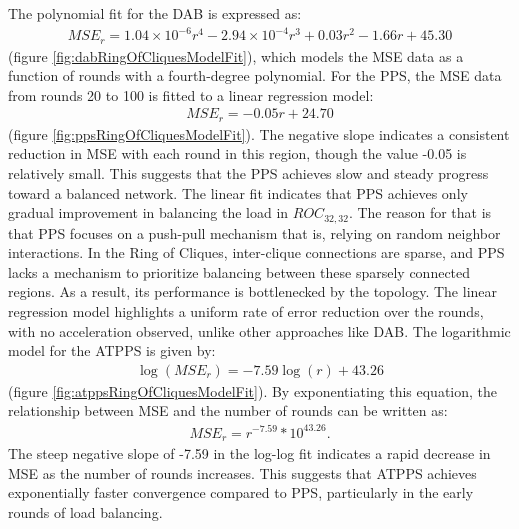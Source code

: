 The polynomial fit for the DAB is expressed as:
\begin{align}
    MSE_r=1.04\times 10^{-6}r^{4}-2.94\times 10^{-4}r^{3}+0.03r^{2}-1.66r+45.30    
\end{align}
(figure \ref{fig:dabRingOfCliquesModelFit}), which models the MSE data as a function of rounds with a fourth-degree polynomial. For the PPS, the MSE data from rounds 20 to 100 is fitted to a linear regression model:
\begin{align}
    MSE_r=-0.05r+24.70
\end{align}
(figure \ref{fig:ppsRingOfCliquesModelFit}). The negative slope indicates a consistent reduction in MSE with each round in this region, though the value -0.05 is relatively small. This suggests that the PPS achieves slow and steady progress toward a balanced network. The linear fit indicates that PPS achieves only gradual improvement in balancing the load in $ROC_{32,32}$. The reason for that is that PPS focuses on a push-pull mechanism that is, relying on random neighbor interactions. In the Ring of Cliques, inter-clique connections are sparse, and PPS lacks a mechanism to prioritize balancing between these sparsely connected regions. As a result, its performance is bottlenecked by the topology. The linear regression model highlights a uniform rate of error reduction over the rounds, with no acceleration observed, unlike other approaches like DAB. The logarithmic model for the ATPPS is given by: 
\begin{align}
    \log{(MSE_r)}=-7.59\log{(r)}+43.26   
\end{align}
(figure \ref{fig:atppsRingOfCliquesModelFit}). By exponentiating this equation, the relationship between MSE and the number of rounds can be written as:
\begin{align}
    MSE_r=r^{-7.59}*10^{43.26}.    
\end{align}
The steep negative slope of -7.59 in the log-log fit indicates a rapid decrease in MSE as the number of rounds increases. This suggests that ATPPS achieves exponentially faster convergence compared to PPS, particularly in the early rounds of load balancing.

